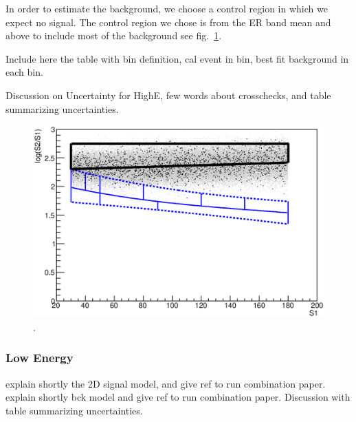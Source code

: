 In order to estimate the background, we choose a control region in which we expect no signal. The control region we chose is from the ER band mean and above to include most of the background see fig.~\ref{fig:phasespace}.

Include here the table  with bin definition, cal event in bin, best fit background in each bin.

Discussion on Uncertainty for HighE, few words about crosschecks, and table summarizing uncertainties.

\begin{figure}[h!]
\begin{minipage}{1.\linewidth}
\centerline{\includegraphics[width=1.\linewidth]{Figures/phasespace.eps}}
\end{minipage}
\caption{.}
\label{fig:phasespace}
\end{figure}  


\subsubsection{Low Energy}
explain shortly the 2D signal model, and give ref to run combination paper.
explain shortly bck model and give ref to run combination paper. Discussion with table
summarizing uncertainties.

